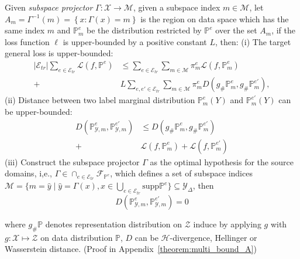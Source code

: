 \begin{theorem}
\label{theorem:multi_bound} Given \textit{subspace projector} $\Gamma: \mathcal{X}\rightarrow \mathcal{M}$, given a subspace index $m\in \mathcal{M}$, let $A_{m}=\Gamma^{-1}(m)=\left\{ x:\Gamma(x)=m\right\} $ is the region on data space which has the same index $m$ and $\mathbb{P}_{m}^{e}$ be the distribution restricted by $\mathbb{P}^{e}$ over the set $A_{m}$, if the loss function $\ell$ is upper-bounded by a positive
constant $L$, then:
(i)  The target general loss is upper-bounded: 
\begin{align*}
\left | \mathcal{E}_{tr} \right |\sum_{e\in \mathcal{E}_{tr}}\mathcal{L}\left ( f,\mathbb{P}^{e} \right )
&\leq
\sum_{e\in \mathcal{E}_{tr}} \sum_{m\in\mathcal{M}}\pi^{e}_m
\mathcal{L}\left ( f,\mathbb{P}^{e}_{m} \right ) \\+
&L\sum_{e, e'\in \mathcal{E}_{tr}}\sum_{m\in\mathcal{M}}\pi^{e}_{m}D\left ( g_{\#}\mathbb{P}^{e}_{m},g_{\#}\mathbb{P}^{e'}_{m} \right ),
\end{align*}
(ii) Distance between two label marginal distribution $\mathbb{P}^{e}_{m}(Y)$ and $\mathbb{P}^{e'}_{m}(Y)$ can be upper-bounded: 
\begin{equation*}
\begin{aligned}
D\left(\mathbb{P}^{e}_{\mathcal{Y}, m},\mathbb{P}^{e'}_{\mathcal{Y},m}\right) &\leq 
D\left ( g_{\#}\mathbb{P}^{e}_{m},g_{\#}\mathbb{P}^{e'}_{m} \right )\\
+&\mathcal{L}\left ( f,\mathbb{P}^{e}_{m}\right )
+
\mathcal{L}\left ( f,\mathbb{P}^{e'}_{m} \right )
\end{aligned}
\end{equation*}
(iii) Construct the subspace projector $\Gamma$ as the optimal hypothesis for the source domains, i,e., \(\Gamma \in \cap_{e\in \mathcal{E}_{tr}}\mathcal{F}_{\mathbb{P}^{e}}\), which defines a set of subspace indices $\mathcal{M}=\{m=\hat{y}\mid \hat{y}=\Gamma(x), x\in\bigcup_{e\in\mathcal{E}_{tr}}\text{supp}\mathbb{P}^{e} \}\subseteq \mathcal{Y}_\Delta$, then
\begin{equation*}
D\left(\mathbb{P}^{e}_{\mathcal{Y}, m},\mathbb{P}^{e'}_{\mathcal{Y},m}\right)=0
\end{equation*}

where $g_{\#}\mathbb{P}$ denotes representation distribution on $\mathcal{Z}$ induce by applying $g$ with $g: \mathcal{X} \mapsto \mathcal{Z}$ on data distribution $\mathbb{P}$, $D$ can be $\mathcal{H}$-divergence, Hellinger or Wasserstein distance. (Proof in Appendix~\ref{theorem:multi_bound_A})
\label{theorem:tradeoff}
\end{theorem}

